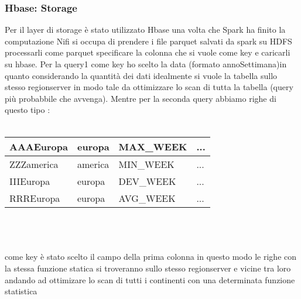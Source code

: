 \documentclass[acmsmall]{acmart}
\begin{document}
\subsubsection{Hbase: Storage}
Per il layer di storage è stato utilizzato Hbase una volta che Spark ha finito la computazione Nifi si occupa di prendere i file parquet salvati 
da spark su HDFS processarli come parquet specificare la colonna che si vuole come key e caricarli su hbase.
Per la query1 come key ho scelto la data (formato annoSettimana)in quanto considerando la quantità dei dati idealmente si vuole la tabella sullo stesso regionserver in modo tale da ottimizzare lo scan di tutta la tabella (query più probabbile che avvenga). Mentre per la seconda query abbiamo righe di questo tipo :
\\
\\
\hspace{1000mm}\begin{tabular}{|l|l|l|l|}
\hline
AAAEuropa  & europa  & MAX\_WEEK & ... \\ \hline
ZZZamerica & america & MIN\_WEEK & ... \\ \hline
IIIEuropa  & europa  & DEV\_WEEK & ... \\ \hline
RRREuropa  & europa  & AVG\_WEEK & ... \\ \hline
\end{tabular}
\\
\\
\\
 come key è stato scelto il campo della prima colonna in questo modo le righe con la stessa funzione statica si troveranno sullo stesso regionserver e vicine tra loro andando ad ottimizare lo scan di tutti i continenti con una determinata funzione statistica 
\end{document}
